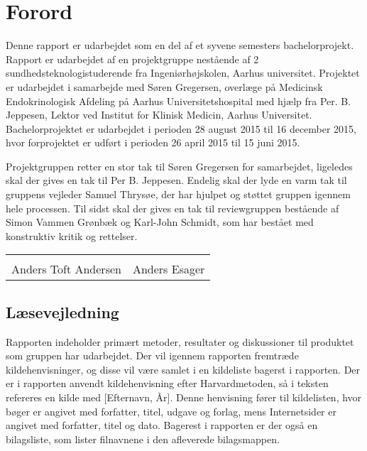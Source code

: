 \chapter*{Forord}

Denne rapport er udarbejdet som en del af et syvene semesters bachelorprojekt. Rapport er udarbejdet af en projektgruppe nestående af 2 sundhedsteknologistuderende fra Ingeniørhøjskolen, Aarhus universitet. Projektet er udarbejdet i samarbejde med Søren Gregersen, overlæge på Medicinsk Endokrinologisk Afdeling på Aarhus Universitetshospital med hjælp fra Per. B. Jeppesen, Lektor ved Institut for Klinisk Medicin, Aarhus Universitet. Bachelorprojektet er udarbejdet i perioden 28 august 2015 til 16 december 2015, hvor forprojektet er udført i perioden 26 april 2015 til 15 juni 2015.  

Projektgruppen retter en stor tak til Søren Gregersen for samarbejdet, ligeledes skal der gives en tak til Per B. Jeppesen. Endelig skal der lyde en varm tak til gruppens vejleder Samuel Thrysøe, der har hjulpet og støttet gruppen igennem hele processen. Til sidst skal der gives en tak til reviewgruppen bestående af Simon Vammen Grønbæk og Karl-John Schmidt, som har bestået med konstruktiv kritik og rettelser. 






\phantom{Luft}

\phantom{Luft}

\begin{table}[H]
	\centering
		\begin{tabular}{c c}
			\underline{\phantom{mmmmmmmmmmmmmm}} & \underline{\phantom{mmmmmmmmmmmmmm}}  \\
			Anders Toft Andersen			& Anders Esager		 			\\ 										\end{tabular}
\end{table}

\section*{Læsevejledning}
Rapporten indeholder primært metoder, resultater og diskussioner til produktet som gruppen har udarbejdet. Der vil igennem rapporten fremtræde kildehenvisninger, og disse vil være samlet i en kildeliste bagerst i rapporten. Der er i rapporten anvendt kildehenvisning efter Harvardmetoden, så i teksten refereres en kilde med [Efternavn, År]. Denne henvisning fører til kildelisten, hvor bøger er angivet med forfatter, titel, udgave og forlag, mens Internetsider er angivet med forfatter, titel og dato. Bagerest i rapporten er der også en bilagsliste, som lister filnavnene i den afleverede bilagsmappen.

